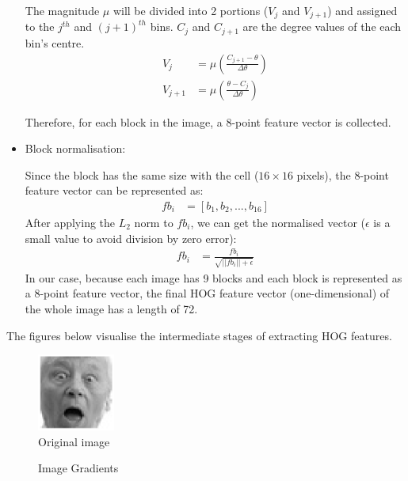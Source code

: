 \documentclass{article}
\begin{document}
\begin{itemize}
The magnitude $\mu$ will be divided into 2 portions ($V_j$ and $V_{j+1}$) and assigned to the $j^{th}$ and $(j+1)^{th}$ bins. $C_j$ and $C_{j+1}$ are the degree values of the each bin's centre.
\begin{align*}
V_j & = \mu(\frac{C_{j+1} - \theta}{\Delta \theta})\\
V_{j+1} &= \mu(\frac{\theta - C_{j}}{\Delta \theta})
\end{align*}

Therefore, for each block in the image, a 8-point feature vector is collected.
\item Block normalisation:

Since the block has the same size with the cell ($16\times16$ pixels), the 8-point feature vector can be represented as:
\begin{align*}
f b_i & = [b_1,b_2, ..., b_{16}]
\end{align*}
After applying the $L_2$ norm to $f b_i$, we can get the normalised vector ($\epsilon$ is a small value to avoid division by zero error):
\begin{align*}
f b_i & = \frac{f b_i}{\sqrt{||f b_i||+\epsilon}}
\end{align*}
In our case, because each image has 9 blocks and each block is represented as a 8-point feature vector, the final HOG feature vector (one-dimensional) of the whole image has a length of 72.

\end{itemize}
The figures below visualise the intermediate stages of extracting HOG features.
\begin{figure}[H]
    \centering
    \includegraphics[height=1in]{HOG figures/original.png}
    \caption{Original image}
\end{figure}

\begin{figure}[H] 
    \centering
    \hspace*{.4in}
    \caption{Image Gradients}
\end{figure}
\end{document}
